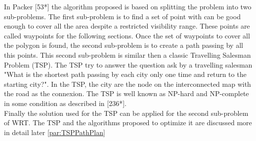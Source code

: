 In Packer [53*] the algorithm proposed is based on splitting the problem into two sub-problems. The first sub-problem is to find a set of point with can be good enough to cover all the area despite a restricted visibility range. These points are called waypoints for the following sections.  
Once the set of waypoints to cover all the polygon is found, the second sub-problem is to create a path passing by all this points. 
 This second sub-problem is similar then a classic Travelling Salesman Problem (TSP). The TSP  try to answer the question ask by a travelling salesman "What is the shortest path passing by each city only one time and return to the starting city?". In the TSP, the city are the node on the interconnected map with the road as the connexion. The TSP is well known as NP-hard and NP-complete in some condition as described in [236*]. \\ 
Finally the solution used for the TSP can be applied for the second sub-problem of WRT.
 The TSP and the algorithms proposed to optimize it are discussed more in detail later \ref{par:TSPPathPlan}


